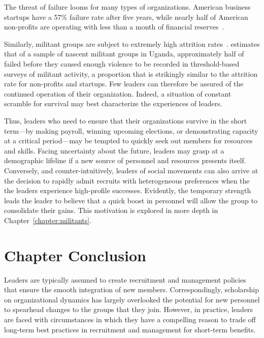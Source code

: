  The threat of failure looms for many types of organizations. American business startups have a 57\% failure rate after five years, while nearly half of American non-profits are operating with less than a month of financial reserves~\autocite{challenges2014nonprofits}. 
 
 Similarly, militant groups are subject to extremely high attrition rates~\autocite{byman2008understanding}. \cite{lewis2017does} estimates that of a sample of nascent militant groups in Uganda, approximately half of failed before they caused enough violence to be recorded in threshold-based surveys of militant activity, a proportion that is strikingly similar to the attrition rate for non-profits and startups. Few leaders can therefore be assured of the continued operation of their organization. Indeed, a situation of constant scramble for survival may best characterize the experiences of leaders.

Thus, leaders who need to ensure that their organizations survive in the short term---by making payroll, winning upcoming elections, or demonstrating capacity at a critical period---may be tempted to quickly seek out members for resources and skills. Facing uncertainty about the future, leaders may grasp at a demographic lifeline if a new source of personnel and resources presents itself. 
Conversely, and counter-intuitively, leaders of social movements can also arrive at the decision to rapidly admit recruits with heterogeneous preferences when the the leaders experience high-profile successes. Evidently, the temporary strength leads the leader to believe that a quick boost in personnel will allow the group to consolidate their gains.  This motivation is explored in more depth in Chapter~\ref{chapter:militants}.
 
    
\section{Chapter Conclusion}

Leaders are typically assumed to create recruitment and management policies that ensure the smooth integration of new members. Correspondingly, scholarship on organizational dynamics has largely overlooked the potential for new personnel to spearhead changes to the groups that they join. However, in practice, leaders are faced with circumstances in which they have a compelling reason to trade off long-term best practices in recruitment and management for short-term benefits. 

